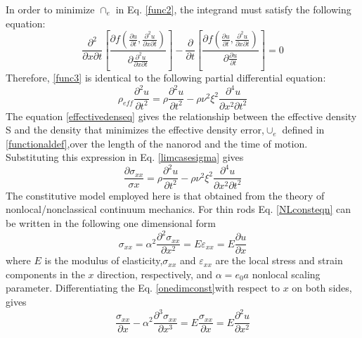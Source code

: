 In order to minimize $\cap_e$ in Eq. \eqref{func2}, the integrand must satisfy the following equation:\\
\begin{equation}
\dfrac{\partial^2}{\partial x \partial t} 
\left[
 \dfrac{\partial f \left(\frac{\partial u}{\partial t},\frac{\partial^2 u}{\partial x \partial t}  \right)}{\partial \frac{\partial^2 u}{\partial x \partial t}}  
\right] 
- 
\dfrac{\partial}{\partial t}
\left[ 
\dfrac{\partial f \left(\frac{\partial u}{\partial t},\frac{\partial^2 u}{\partial x \partial t}  \right)}{\partial \frac{\partial u}{\partial t}}  
\right] = 0
\label{func3}
\end{equation}
Therefore, \eqref{func3} is identical to the following partial differential equation:\\
\begin{equation}
\rho_{eff} \frac{\partial^2 u}{\partial t^2} = \rho \frac{\partial^2 u}{\partial t^2} - \rho \nu^2 \xi^2 \frac{\partial^4 u}{\partial x^2 \partial t^2}
\label{effectivedenseq}
\end{equation}
The equation \eqref{effectivedenseq} gives the relationship between the effective density
S
and the density that minimizes the effective density error,$\cup_e$ defined in \eqref{functionaldef},over the length of the nanorod and the time of
motion. Substituting this expression in Eq. \eqref{limcasesigma} gives\\
\begin{equation}
\dfrac{\partial \sigma_{xx}}{\sigma x} = \rho \dfrac{\partial^2 u}{\partial t^2} - \rho \nu^2 \xi^2 \dfrac{\partial^4 u}{\partial x^2 \partial t^2}
\end{equation}
The constitutive model employed here is that obtained from the
theory of nonlocal/nonclassical continuum mechanics. For thin
rods Eq. \eqref{NLconsteqn} can be written in the following one dimensional form\\
\begin{equation}
\sigma_{xx} = \alpha^2 \frac{\partial^2 \sigma_{xx}}{\partial x^2} = E \varepsilon_{xx} = E \frac{\partial u}{\partial x}
\label{onedimconst}
\end{equation}
where $E$ is the modulus of elasticity,$\sigma_{xx}$ and $\varepsilon_{xx}$ are the local stress
and strain components in the $x$ direction, respectively, and $\alpha=e_0 a$ nonlocal scaling parameter. Differentiating the Eq. \eqref{onedimconst}with respect to $x$ on both sides, gives\\
\begin{equation}
\frac{\sigma_{xx}}{\partial x} - \alpha^2 \frac{\partial^3 \sigma_{xx}}{\partial x^3} = E \frac{\sigma_{xx}}{\partial x} = E \frac{\partial^2 u}{\partial x^2}
\label{diffonedimconst}
\end{equation}
